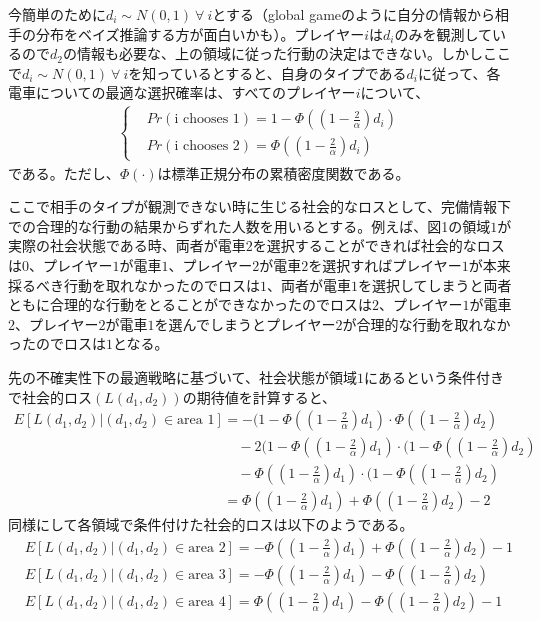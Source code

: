 \documentclass{jsarticle}
\begin{document}
今簡単のために$d_i \sim N(0,1)\ \forall\ i$とする（global gameのように自分の情報から相手の分布をベイズ推論する方が面白いかも）。プレイヤー$i$は$d_i$のみを観測しているので$d_2$の情報も必要な、上の領域に従った行動の決定はできない。しかしここで$d_i \sim N(0,1)\ \forall\ i$を知っているとすると、自身のタイプである$d_i$に従って、各電車についての最適な選択確率は、すべてのプレイヤー$i$について、
\begin{align*}
	\begin{cases}
	&Pr(\text{i chooses 1}) = 1 - \Phi((1 - \frac{2}{\alpha})d_i)\\[8pt]
	&Pr(\text{i chooses 2}) = \Phi((1 - \frac{2}{\alpha})d_i)
	\end{cases}
\end{align*}
である。ただし、$\Phi(\cdot)$は標準正規分布の累積密度関数である。

ここで相手のタイプが観測できない時に生じる社会的なロスとして、完備情報下での合理的な行動の結果からずれた人数を用いるとする。例えば、図1の領域$1$が実際の社会状態である時、両者が電車$2$を選択することができれば社会的なロスは$0$、プレイヤー$1$が電車$1$、プレイヤー$2$が電車$2$を選択すればプレイヤー$1$が本来採るべき行動を取れなかったのでロスは$1$、両者が電車$1$を選択してしまうと両者ともに合理的な行動をとることができなかったのでロスは$2$、プレイヤー$1$が電車$2$、プレイヤー$2$が電車$1$を選んでしまうとプレイヤー$2$が合理的な行動を取れなかったのでロスは$1$となる。

先の不確実性下の最適戦略に基づいて、社会状態が領域$1$にあるという条件付きで社会的ロス$(L(d_1, d_2))$の期待値を計算すると、
\begin{align*}
	E[L(d_1, d_2) | (d_1, d_2) \in \text{area 1}] &= -(1 - \Phi((1 - \frac{2}{\alpha})d_1)\cdot \Phi((1 - \frac{2}{\alpha})d_2) \\
	&\quad -2(1 - \Phi((1 - \frac{2}{\alpha})d_1)\cdot(1 - \Phi((1 - \frac{2}{\alpha})d_2) \\
	&\quad -\Phi((1 - \frac{2}{\alpha})d_1)\cdot(1 - \Phi((1 - \frac{2}{\alpha})d_2)\\
	&= \Phi((1 - \frac{2}{\alpha})d_1) + \Phi((1 - \frac{2}{\alpha})d_2) - 2
\end{align*}
同様にして各領域で条件付けた社会的ロスは以下のようである。
\begin{align*}
	&E[L(d_1, d_2) | (d_1, d_2) \in \text{area 2}] = - \Phi((1 - \frac{2}{\alpha})d_1) + \Phi((1 - \frac{2}{\alpha})d_2) - 1\\
	&E[L(d_1, d_2) | (d_1, d_2) \in \text{area 3}] = - \Phi((1 - \frac{2}{\alpha})d_1) - \Phi((1 - \frac{2}{\alpha})d_2) \\
	&E[L(d_1, d_2) | (d_1, d_2) \in \text{area 4}] =  \Phi((1 - \frac{2}{\alpha})d_1) - \Phi((1 - \frac{2}{\alpha})d_2) - 1
\end{align*}
\end{document}
